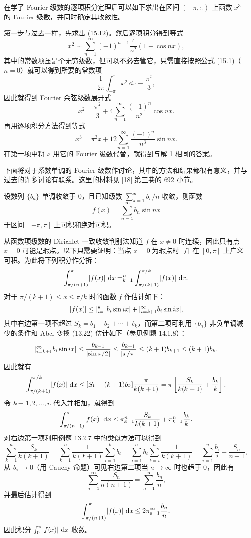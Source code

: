 \begin{xexample}[15.1.2 之解 3]
在学了 Fourier 级数的逐项积分定理后可以如下求出在区间 $(-\pi,\pi)$ 上函数 $x^3$ 的 Fourier 级数，并同时确定其收敛性。
\end{xexample}
\begin{xsolution}
第一步与过去一样，先求出 (15.12)。然后逐项积分得到等式
\[
  x^2\sim\sum_{n=1}^{\infty}(-1)^{n-1}\frac4{n^2}(1-\cos nx),
\]
其中的常数项虽是个无穷级数，但可以不必去管它，只需直接按照公式 (15.1)（$n=0$）就可以得到所要的常数项
\[
  \frac1{2\pi}\int_{-\pi}^{\pi}x^2\,\dd x=\frac{\pi^2}{3},
\]
因此就得到 Fourier 余弦级数展开式
\[
  x^2=\frac{\pi^2}{3}+4\sum_{n=1}^{\infty}\frac{(-1)^n}{n^2}\cos nx.
\]
再用逐项积分方法得到等式
\[
  x^3=\pi^2x+12\sum_{n=1}^{\infty}\frac{(-1)^n}{n^3}\sin nx.
\]
在第一项中将 $x$ 用它的 Fourier 级数代替，就得到与解 1 相同的答案。
\end{xsolution}

下面将对于系数单调的 Fourier 级数作讨论，其中的方法和结果都很有意义，并与过去的许多讨论有联系。这里的材料见 [18] 第三卷的 692 小节。

\begin{xexample}[15.2.3]
设数列 $\{b_n\}$ 单调收敛于 0，且已知级数 $\sum_{n=1}^{\infty}b_n/n$ 收敛，则函数
\[
  f(x)=\sum_{n=1}^{\infty}b_n\sin nx
\]
于区间 $[-\pi,\pi]$ 上可积和绝对可积。
\end{xexample}
\begin{xproof}
从函数项级数的 Dirichlet 一致收敛判别法知道 $f$ 在 $x\ne0$ 时连续，因此只有点 $x=0$ 可能是瑕点。以下只需要证明：当点 $x=0$ 为瑕点时 $\lvert f\rvert$ 在 $[0,\pi]$ 上广义可积。为此将下列积分作分拆：
\[
  \int_{\pi/(n+1)}^{\pi}\lvert f(x)\rvert\,\mathop{}\!\mathrm{d} x
  =\relax_{k=1}^{n}\int_{\pi/(k+1)}^{\pi/k}\lvert f(x)\rvert\,\mathop{}\!\mathrm{d} x.
\]
对于 $\pi/(k+1)\le x\le\pi/k$ 时的函数 $f$ 作估计如下：
\[
  \lvert f(x)\rvert\le\lvert\relax_{i=1}^{k}b_i\sin ix\rvert+\lvert\relax_{i=k+1}^{\infty}b_i\sin ix\rvert,
\]
其中右边第一项不超过 $S_k=b_1+b_2+\cdots+b_k$，而第二项可利用 $\{b_n\}$ 非负单调减少的条件和 Abel 变换 (13.22) 估计如下（参见例题 14.1.8）：
\[
  \lvert\relax_{i=k+1}^{\infty}b_i\sin ix\rvert
  \le\frac{b_{k+1}}{\lvert\sin x/2\rvert}
  \le\frac{b_{k+1}}{\lvert x/\pi\rvert}
  \le(k+1)b_{k+1}\le(k+1)b_k.
\]
因此就有
\[
  \int_{\pi/(k+1)}^{\pi/k}\lvert f(x)\rvert\,\mathop{}\!\mathrm{d} x
  \le[S_k+(k+1)b_k]\frac{\pi}{k(k+1)}
  =\pi\left[\frac{S_k}{k(k+1)}+\frac{b_k}{k}\right].
\]
令 $k=1,2,\ldots,n$ 代入并相加，就得到
\[
  \int_{\pi/(n+1)}^{\pi}\lvert f(x)\rvert\,\mathop{}\!\mathrm{d} x
  \le\pi\relax_{k=1}^{n}\frac{S_k}{k(k+1)}+\pi\relax_{k=1}^{n}\frac{b_k}{k}.
\]
对右边第一项利用例题 13.2.7 中的类似方法可以得到
\[
  \sum_{k=1}^{n}\frac{S_k}{k(k+1)}
  =\sum_{k=1}^{n}\frac1{k(k+1)}\sum_{i=1}^{k}b_i
  =\sum_{i=1}^{n}b_i\sum_{k=i}^{n}\frac1{k(k+1)}
  =\sum_{i=1}^{n}\frac{b_i}{i}-\frac{S_n}{n+1},
\]
从 $b_n\to0$（用 Cauchy 命题）可见右边第二项当 $n\to\infty$ 时也趋于 0，因此有
\[
  \sum_{n=1}^{\infty}\frac{S_n}{n(n+1)}=\sum_{n=1}^{\infty}\frac{b_n}{n},
\]
并最后估计得到
\[
  \int_{\pi/(n+1)}^{\pi}\lvert f(x)\rvert\,\mathop{}\!\mathrm{d} x\le2\pi\relax_{n=1}^{\infty}\frac{b_n}{n}.
\]
因此积分 $\int_0^{\pi}\lvert f(x)\rvert\,\mathop{}\!\mathrm{d} x$ 收敛。
\end{xproof}

